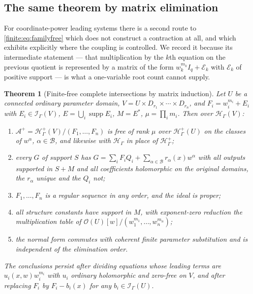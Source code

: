 \documentclass[11pt,letterpaper]{article}
\newtheorem{theorem}{Theorem}[section]
\theoremstyle{definition}
\theoremstyle{remark}
\newcommand{\OO}{\mathcal O}
\newcommand{\HH}{\mathscr H}
\newcommand{\Hp}{\mathscr H^{+}}
\newcommand{\Ip}{\mathscr I}
\newcommand{\Alg}{\mathcal A}
\newcommand{\bx}{\mathcal B}
\DeclareMathOperator{\supp}{supp}
\numberwithin{equation}{section}
\begin{document}
\subsection{The same theorem by matrix elimination}
\label{finite:sec:matrixroute}

For coordinate-power leading systems there is a second route to \eqref{finite:eq:familyfree} which does not construct a contraction at all, and which exhibits explicitly where the coupling is controlled. We record it because its intermediate statement --- that multiplication by the $k$th equation on the previous quotient is represented by a matrix of the form $w_k^{m_k}I_q+\mathcal E_k$ with $\mathcal E_k$ of positive support --- is what a one-variable root count cannot supply.

\begin{theorem}[Finite-free complete intersections by matrix induction]
\label{finite:thm:finitefree15}
Let $U$ be a connected ordinary parameter domain, $V=U\times D_{r_1}\times\cdots\times D_{r_n}$, and $F_i=w_i^{m_i}+E_i$ with $E_i\in\Ip_\Gamma(V)$, $E=\bigcup_i\supp E_i$, $M=E^*$, $\mu=\prod_im_i$. Then over $\HH_\Gamma(V)$:
\begin{enumerate}
\item $\Alg^+=\Hp_\Gamma(V)/(F_1,\ldots,F_n)$ is free of rank $\mu$ over $\Hp_\Gamma(U)$ on the classes of $w^\alpha$, $\alpha\in\bx$, and likewise with $\HH_\Gamma$ in place of $\Hp_\Gamma$;
\item every $G$ of support $S$ has $G=\sum_iF_iQ_i+\sum_{\alpha\in\bx}r_\alpha(x)w^\alpha$ with all outputs supported in $S+M$ and all coefficients holomorphic on the original domains, the $r_\alpha$ unique and the $Q_i$ not;
\item $F_1,\ldots,F_n$ is a regular sequence \emph{in any order}, and the ideal is proper;
\item all structure constants have support in $M$, with exponent-zero reduction the multiplication table of $\OO(U)[w]/(w_1^{m_1},\ldots,w_n^{m_n})$;
\item the normal form commutes with coherent finite parameter substitution and is independent of the elimination order.
\end{enumerate}
The conclusions persist after dividing equations whose leading terms are $u_i(x,w)w_i^{m_i}$ with $u_i$ ordinary holomorphic and zero-free on $V$, and after replacing $F_i$ by $F_i-b_i(x)$ for any $b_i\in\Ip_\Gamma(U)$.
\end{theorem}
\end{document}

